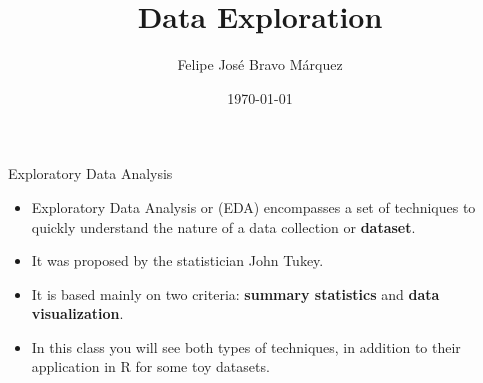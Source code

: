 \documentclass[handout]{beamer}
\title{Data Exploration}
\author[Felipe Bravo Márquez]{\footnotesize
 \textcolor[rgb]{0.00,0.00,1.00}{Felipe José Bravo Márquez}}
\date{ \today }
\begin{document}
\begin{frame}
\titlepage


\end{frame}








\begin{frame}{Exploratory Data Analysis}
\scriptsize{
\begin{itemize}
 \item Exploratory Data Analysis or (EDA) encompasses a set of techniques to quickly understand the nature of a data collection or \textbf{dataset}.
 
 \item It was proposed by the statistician John Tukey.
 
 \item It is based mainly on two criteria: \textbf{summary statistics} and \textbf{data visualization}.
 
 \item In this class you will see both types of techniques, in addition to their application in R for some toy datasets.
\end{itemize}

}

\end{frame}
\end{document}
